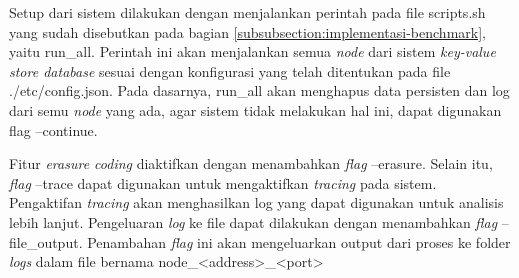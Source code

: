 Setup dari sistem dilakukan dengan menjalankan perintah pada file scripts.sh yang sudah disebutkan pada bagian \ref{subsubsection:implementasi-benchmark}, yaitu run\_all. Perintah ini akan menjalankan semua \textit{node} dari sistem \textit{key-value store database} sesuai dengan konfigurasi yang telah ditentukan pada file ./etc/config.json. Pada dasarnya, run\_all akan menghapus data persisten dan log dari semu \textit{node} yang ada, agar sistem tidak melakukan hal ini, dapat digunakan flag --continue.

Fitur \textit{erasure coding} diaktifkan dengan menambahkan \textit{flag} --erasure. Selain itu, \textit{flag} --trace dapat digunakan untuk mengaktifkan \textit{tracing} pada sistem. Pengaktifan \textit{tracing} akan menghasilkan log yang dapat digunakan untuk analisis lebih lanjut. Pengeluaran \textit{log} ke file dapat dilakukan dengan menambahkan \textit{flag} --file\_output. Penambahan \textit{flag} ini akan mengeluarkan output dari proses ke folder \textit{logs} dalam file bernama node\_<address>\_<port>